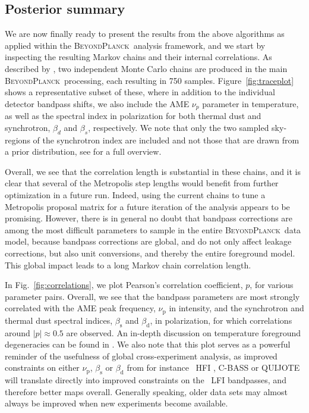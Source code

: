 \documentclass[twocolumn]{aa}
\newcommand{\BP}{\textsc{BeyondPlanck}}
\newcommand{\?}[1]{\textcolor{red}{{\bf [#1]}}}
\begin{document}
\subsection{Posterior summary}

We are now finally ready to present the results from the above algorithms as
applied within the \BP\ analysis framework, and we start by inspecting the
resulting Markov chains and their internal correlations. As described by
\citet{bp01}, two independent Monte Carlo chains are produced in the main \BP\
processing, each resulting in 750 samples. Figure~\ref{fig:traceplot} shows a
representative subset of these, where in addition to the individual detector
bandpass shifts, we also include the AME $\nu_p$ parameter in temperature, as
well as the spectral index in polarization for both thermal dust and
synchrotron, $\beta_d$ and $\beta_s$, respectively. We note that only the two
sampled sky-regions of the synchrotron index are included and not those that are
drawn from a prior distribution, see \citet{bp14} for a full overview. 

Overall, we see that the correlation length is substantial in these
chains, and it is clear that several of the Metropolis step lengths would
benefit from further optimization in a future run. Indeed, using the current
chains to tune a Metropolis proposal matrix for a future iteration of the
analysis appears to be promising. However, there is in general no doubt that bandpass
corrections are among the most difficult parameters to sample in the entire \BP\
data model, because bandpass corrections are global, and do not only affect
leakage corrections, but also unit conversions, and thereby the entire
foreground model. This global impact leads to a long Markov chain correlation
length.

In Fig.~\ref{fig:correlations}, we plot Pearson's correlation
coefficient, $p$, for various parameter pairs. Overall, we see that
the bandpass parameters are most strongly correlated with the AME peak
frequency, $\nu_{\mathrm{p}}$ in intensity, and the synchrotron and
thermal dust spectral indices, $\beta_{\mathrm{s}}$ and
$\beta_{\mathrm{d}}$, in polarization, for which correlations around
$|p|\approx0.5$ are observed. An in-depth discussion on temperature
foreground degeneracies can be found in \citet{bp13}. We also note
that this plot serves as a powerful reminder of the usefulness of
global cross-experiment analysis, as improved constraints on either
$\nu_{\mathrm{p}}$, $\beta_{\mathrm{s}}$ or $\beta_{\mathrm{d}}$ from
for instance \Planck\ HFI \citep{planck2016-l03}, C-BASS
\citep{king2010} or QUIJOTE \citep{QUIJOTE_I_2015} will translate
directly into improved constraints on the \Planck\ LFI bandpasses, and
therefore better maps overall. Generally speaking, older data sets may
almost always be improved when new experiments become available.
\end{document}
